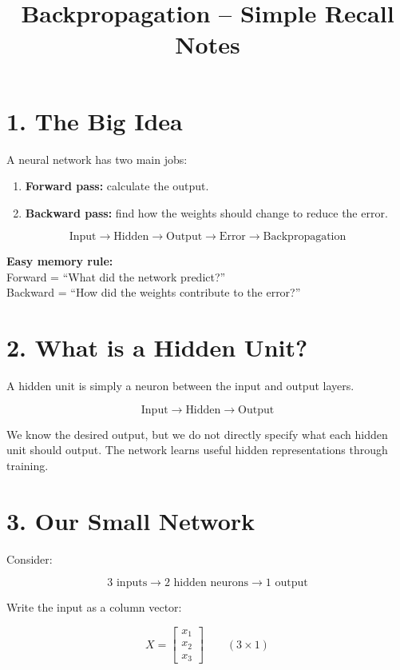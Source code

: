 \documentclass[11pt]{article}
\title{Backpropagation -- Simple Recall Notes}
\author{}
\date{}
\begin{document}
\maketitle

\section*{1. The Big Idea}

A neural network has two main jobs:

\begin{enumerate}
\item \textbf{Forward pass:} calculate the output.
\item \textbf{Backward pass:} find how the weights should change to reduce the error.
\end{enumerate}

\[
\boxed{\text{Input}\rightarrow\text{Hidden}\rightarrow\text{Output}
\rightarrow\text{Error}\rightarrow\text{Backpropagation}}
\]

\begin{tcolorbox}
\textbf{Easy memory rule:}\\
Forward = ``What did the network predict?''\\
Backward = ``How did the weights contribute to the error?''
\end{tcolorbox}

\section*{2. What is a Hidden Unit?}

A hidden unit is simply a neuron between the input and output layers.

\[
\text{Input}\rightarrow\boxed{\text{Hidden}}\rightarrow\text{Output}
\]

We know the desired output, but we do not directly specify what each hidden unit should output. The network learns useful hidden representations through training.

\section*{3. Our Small Network}

Consider:

\[
\boxed{3\text{ inputs}\rightarrow2\text{ hidden neurons}\rightarrow1\text{ output}}
\]

Write the input as a column vector:

\[
X=
\begin{bmatrix}
x_1\\x_2\\x_3
\end{bmatrix}
\qquad (3\times1)
\]
\end{document}
